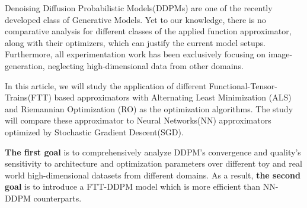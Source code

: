 \documentclass[11pt]{article}
\begin{document}
    Denoising Diffusion Probabilistic Models(DDPMs) are one of the recently developed class of Generative Models.
    Yet to our knowledge, there is no comparative analysis for different classes of the applied function approximator,
    along with their optimizers, which can justify the current model setups.
    Furthermore, all experimentation work has been exclusively focusing on image-generation, neglecting high-dimensional
    data from other domains.


    In this article, we will study the application of different Functional-Tensor-Trains(FTT) based approximators
    with Alternating Least Minimization (ALS) and Riemannian Optimization (RO) as the optimization algorithms.
    The study will compare these approximator to Neural Networks(NN) approximators optimized by Stochastic Gradient Descent(SGD).


    \textbf{The first goal} is to comprehensively analyze DDPM's convergence and quality's sensitivity to architecture and
    optimization parameters over different toy and real world high-dimensional datasets from different domains.
    As a result, \textbf{the second goal} is to introduce a FTT-DDPM model which is more efficient than NN-DDPM counterparts.
\end{document}
